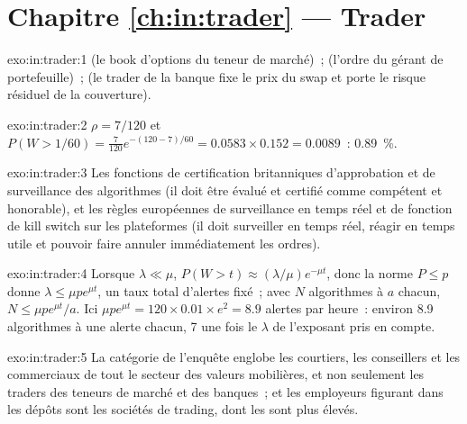 \section*{Chapitre \ref{ch:in:trader} --- Trader}

\begin{solution}{exo:in:trader:1}
 (le book d'options du teneur de marché)~;  (l'ordre du gérant de portefeuille)~;  (le
trader de la banque fixe le prix du swap et porte le risque résiduel de la couverture).
\end{solution}

\begin{solution}{exo:in:trader:2}
$\rho=7/120$ et $P(W>1/60)=\frac{7}{120}e^{-(120-7)/60}=0.0583\times0.152=0.0089$~: 0.89~\%.
\end{solution}

\begin{solution}{exo:in:trader:3}
Les fonctions de certification britanniques d'approbation et de surveillance des algorithmes (il doit être évalué et certifié comme compétent et
honorable), et les règles européennes de surveillance en temps réel et de fonction de kill switch sur les plateformes (il doit surveiller
en temps réel, réagir en temps utile et pouvoir faire annuler immédiatement les ordres).
\end{solution}

\begin{solution}{exo:in:trader:4}
Lorsque $\lambda\ll\mu$, $P(W>t)\approx(\lambda/\mu)e^{-\mu t}$, donc la norme $P\le p$ donne $\lambda\le\mu pe^{\mu t}$, un
taux total d'alertes fixé~; avec $N$ algorithmes à $a$ chacun, $N\le\mu pe^{\mu t}/a$. Ici $\mu pe^{\mu t}=120\times0.01\times
e^{2}=8.9$ alertes par heure~: environ 8.9 algorithmes à une alerte chacun, 7 une fois le $\lambda$ de l'exposant pris en compte.
\end{solution}

\begin{solution}{exo:in:trader:5}
La catégorie de l'enquête englobe les courtiers, les conseillers et les commerciaux de tout le secteur des valeurs mobilières, et non seulement les traders
des teneurs de marché et des banques~; et les employeurs figurant dans les dépôts sont les sociétés de trading, dont les  sont plus élevés.
\end{solution}


